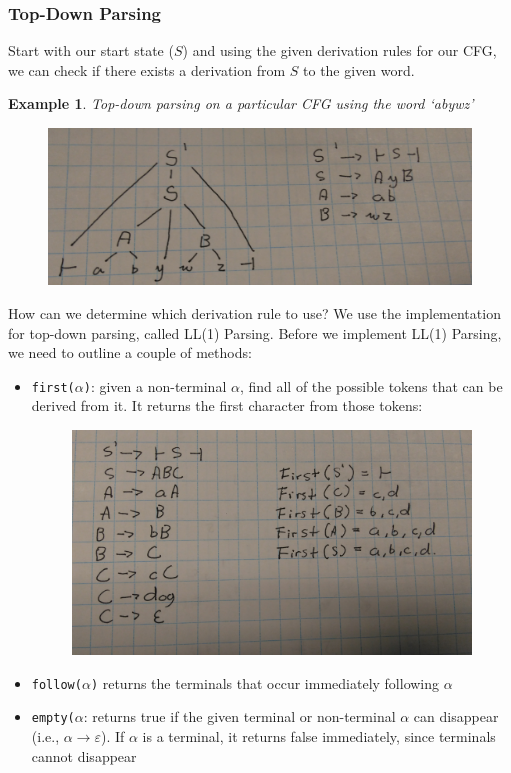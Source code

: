 \documentclass{report}
\newtheorem{ex}{Example}[section]
\begin{document}
\subsubsection{Top-Down Parsing}
Start with our start state ($S$) and using the given derivation rules for our CFG, we can check if there exists a derivation from $S$ to the given word.
\begin{ex}
Top-down parsing on a particular CFG using the word `abywz'
\end{ex}
\begin{figure}[ht]
\begin{center}
\includegraphics[scale=0.1]{top-down1.jpg}
\end{center}
\end{figure}
How can we determine which derivation rule to use? We use the implementation for top-down parsing, called LL(1) Parsing.
Before we implement LL(1) Parsing, we need to outline a couple of methods:
\begin{itemize}
\item \texttt{first($\alpha$)}: given a non-terminal $\alpha$, find all of the possible tokens that can be derived from it. It returns the first character from those tokens:
\begin{figure}[ht]
\begin{center}
\includegraphics[scale=0.05]{first1.jpg}
\end{center}
\end{figure}
\item \texttt{follow($\alpha$)} returns the terminals that occur immediately following $\alpha$
\item \texttt{empty($\alpha$}: returns true if the given terminal or non-terminal $\alpha$ can disappear (i.e., $\alpha \rightarrow \varepsilon$). If $\alpha$ is a terminal, it returns false immediately, since terminals cannot disappear
\end{itemize}
\end{document}
